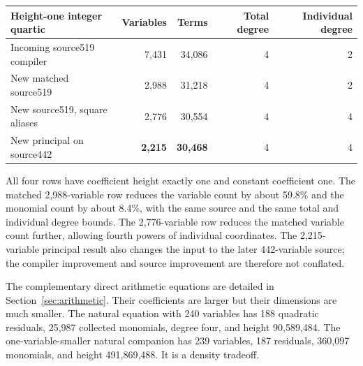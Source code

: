 \begin{center}
\small
\begin{tabular}{@{}lrrrr@{}}
\toprule
Height-one integer quartic & Variables & Terms & Total degree & Individual degree\\
\midrule
Incoming source519 compiler & 7,431 & 34,086 & 4 & 2\\
New matched source519 & 2,988 & 31,218 & 4 & 2\\
New source519, square aliases & 2,776 & 30,554 & 4 & 4\\
New principal on source442 & \textbf{2,215} & \textbf{30,468} & 4 & 4\\
\bottomrule
\end{tabular}
\end{center}
All four rows have coefficient height exactly one and constant coefficient
one. The matched 2,988-variable row reduces the variable count by about
59.8\% and the monomial count by about 8.4\%, with the same source and the same
total and individual degree bounds. The 2,776-variable row reduces the matched
variable count further, allowing fourth powers of individual coordinates.
The 2,215-variable principal result also changes the input to the later
442-variable source; the compiler improvement and source improvement are
therefore not conflated.

The complementary direct arithmetic equations are detailed in
Section~\ref{sec:arithmetic}. Their coefficients are larger but their dimensions
are much smaller. The natural equation with 240 variables has 188 quadratic
residuals, 25,987 collected monomials, degree four, and height 90,589,484.
The one-variable-smaller natural companion has 239 variables, 187 residuals,
360,097 monomials, and height 491,869,488. It is a density tradeoff.
